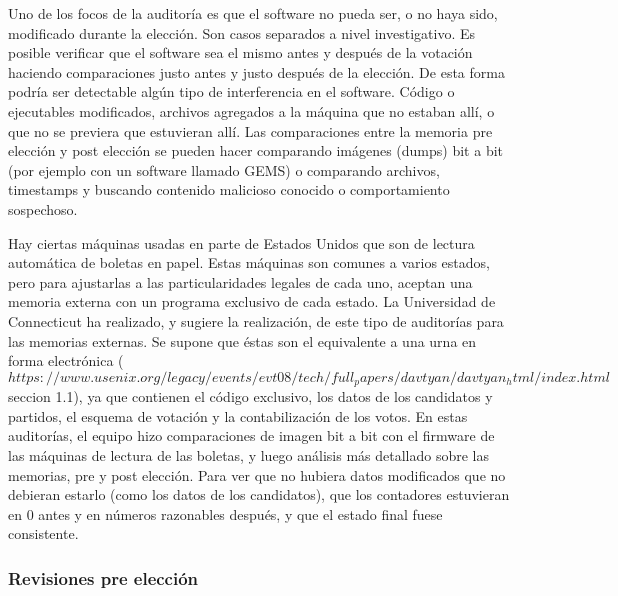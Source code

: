 Uno de los focos de la auditoría es que el software no pueda ser, o no haya sido, modificado durante la elección. Son casos separados a nivel investigativo. Es posible verificar que el software sea el mismo antes y después de la votación haciendo comparaciones justo antes y justo después de la elección. De esta forma podría ser detectable algún tipo de interferencia en el software. Código o ejecutables modificados, archivos agregados a la máquina que no estaban allí, o que no se previera que estuvieran allí. Las comparaciones entre la memoria pre elección y post elección se pueden hacer comparando imágenes (dumps) bit a bit (por ejemplo con un software llamado GEMS) o comparando archivos, timestamps y buscando contenido malicioso conocido o comportamiento sospechoso.

Hay ciertas máquinas usadas en parte de Estados Unidos que son de lectura automática de boletas en papel. Estas máquinas son comunes a varios estados, pero para ajustarlas a las particularidades legales de cada uno, aceptan una memoria externa con un programa exclusivo de cada estado. La Universidad de Connecticut ha realizado, y sugiere la realización, de este tipo de auditorías para las memorias externas. Se supone que éstas son el equivalente a una urna en forma electrónica ($https://www.usenix.org/legacy/events/evt08/tech/full_papers/davtyan/davtyan_html/index.html$ seccion 1.1), ya que contienen el código exclusivo, los datos de los candidatos y partidos, el esquema de votación y la contabilización de los votos.
En estas auditorías, el equipo hizo comparaciones de imagen bit a bit con el firmware de las máquinas de lectura de las boletas, y luego análisis más detallado sobre las memorias, pre y post elección. Para ver que no hubiera datos modificados que no debieran estarlo (como los datos de los candidatos), que los contadores estuvieran en 0 antes y en números razonables después, y que el estado final fuese consistente.

\subsubsection{Revisiones pre elección}

